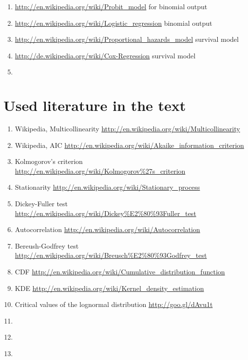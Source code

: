 \documentclass{article}
\begin{document}
\begin{enumerate}
		\begin{enumerate}
			\item \textcolor{black}{\url{http://en.wikipedia.org/wiki/Probit_model}} for binomial output
			\item \textcolor{black}{\url{http://en.wikipedia.org/wiki/Logistic_regression}}	binomial output
			\item \textcolor{black}{\url{http://en.wikipedia.org/wiki/Proportional_hazards_model}} survival model 
			\item \textcolor{black}{\url{http://de.wikipedia.org/wiki/Cox-Regression}} survival model
			\item \textcolor{black}{\url{}}
		\end{enumerate}
\end{enumerate}
\section*{Used literature in the text}
\begin{enumerate}
	\item Wikipedia, Multicollinearity \url{http://en.wikipedia.org/wiki/Multicollinearity}
	\item Wikipedia, AIC \url{http://en.wikipedia.org/wiki/Akaike_information_criterion}
	\item Kolmogorov's criterion \url{http://en.wikipedia.org/wiki/Kolmogorov\%27s_criterion}
	\item Stationarity \url{http://en.wikipedia.org/wiki/Stationary_process}
	\item Dickey-Fuller test \url{http://en.wikipedia.org/wiki/Dickey\%E2\%80\%93Fuller_test}
	\item Autocorrelation \url{http://en.wikipedia.org/wiki/Autocorrelation}
	\item Bereush-Godfrey test \url{http://en.wikipedia.org/wiki/Breusch\%E2\%80\%93Godfrey_test}
	\item CDF \url{http://en.wikipedia.org/wiki/Cumulative_distribution_function}
	\item KDE \url{http://en.wikipedia.org/wiki/Kernel_density_estimation}
	\item Critical values of the lognormal distribution \url{http://goo.gl/dAvu1t}
	\item  \url{}
	\item  \url{}
	\item  \url{}
\end{enumerate}
\end{document}
